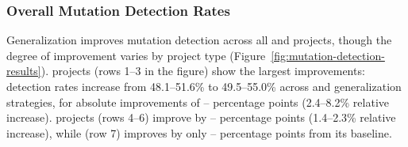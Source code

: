 

\subsubsection{Overall Mutation Detection Rates}%
\label{sec:overall-detection-rates}

Generalization improves mutation detection across all
\DatasetsEqBenchEs{} and \DatasetsCommons{} projects,
though the degree of improvement varies by project type
(Figure~\ref{fig:mutation-detection-results}).
\DatasetsEqBenchEs{} projects (rows 1--3 in the figure) show the largest improvements:
detection rates increase from 48.1--51.6\% to 49.5--55.0\%
across \tries{} and generalization strategies,
for absolute improvements of
\TzEffectivenessEqbenchEvosuiteMutationImprovementMinPp{}--\TzEffectivenessEqbenchEvosuiteMutationImprovementMaxPp{}
percentage points (2.4--8.2\% relative increase).
\DatasetsCommonsEs{} projects (rows 4--6) improve by
\TzEffectivenessCommonsEvosuiteMutationImprovementMinPp{}--\TzEffectivenessCommonsEvosuiteMutationImprovementMaxPp{}
percentage points (1.4--2.3\% relative increase),
while \DatasetCommonsDev{} (row 7) improves by only
\TzEffectivenessCommonsDeveloperMutationImprovementMinPp{}--\TzEffectivenessCommonsDeveloperMutationImprovementMaxPp{}
percentage points from its \TzEffectivenessCommonsDeveloperBaselineMutationScorePct{} baseline.

